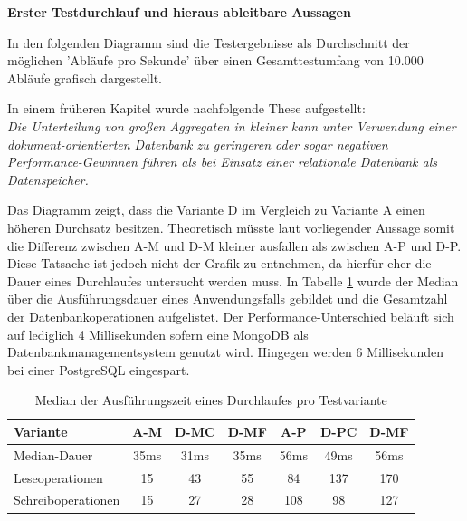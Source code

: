 \textbf{Erster Testdurchlauf und hieraus ableitbare Aussagen}

In den folgenden Diagramm sind die Testergebnisse als Durchschnitt der möglichen 'Abläufe pro Sekunde' über einen Gesamttestumfang von 10.000 Abläufe grafisch dargestellt. 


In einem früheren Kapitel wurde nachfolgende These aufgestellt: \\
\emph{Die Unterteilung von großen Aggregaten in kleiner kann unter Verwendung einer dokument-orientierten Datenbank zu geringeren oder sogar negativen Performance-Gewinnen führen als bei Einsatz einer relationale Datenbank als Datenspeicher.}

Das Diagramm zeigt, dass die Variante D im Vergleich zu Variante A einen höheren Durchsatz besitzen. Theoretisch müsste laut vorliegender Aussage somit die Differenz zwischen A-M und D-M kleiner ausfallen als zwischen A-P und D-P. Diese Tatsache ist jedoch nicht der Grafik zu entnehmen, da hierfür eher die Dauer eines Durchlaufes untersucht werden muss. In Tabelle \ref{fig:durationofexecution} wurde der Median über die Ausführungsdauer eines Anwendungsfalls gebildet und die Gesamtzahl der Datenbankoperationen aufgelistet. Der Performance-Unterschied beläuft sich auf lediglich 4 Millisekunden sofern eine MongoDB als Datenbankmanagementsystem genutzt wird. Hingegen werden 6 Millisekunden bei einer PostgreSQL eingespart.

\begin{table}[h!]
	\centering
	\begin{tabular}{ | >{\raggedright\arraybackslash}m{} || c | c | c | c | c | c | } 
		\hline
		Variante & A-M & D-MC & D-MF & A-P & D-PC & D-MF \\ 
		\hline
		Median-Dauer & 35ms & 31ms & 35ms & 56ms & 49ms & 56ms \\
		\hline
		Leseoperationen & 15 & 43 &  55 &  84 & 137 & 170 \\
		\hline
		Schreiboperationen & 15 & 27 & 28 & 108 & 98 & 127 \\
		\hline
	\end{tabular}
	\caption{Median der Ausführungszeit eines Durchlaufes pro Testvariante}
	\label{fig:durationofexecution}
\end{table}











